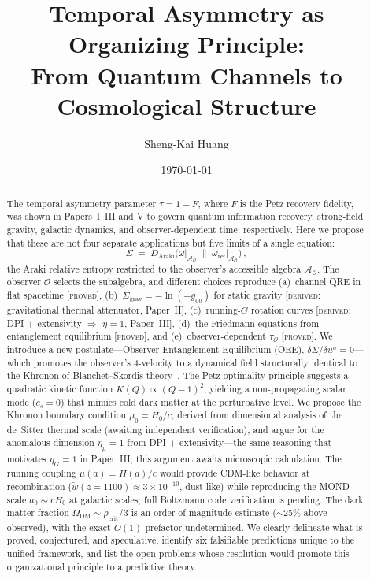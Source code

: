 \documentclass[prd,twocolumn,superscriptaddress,longbibliography,floatfix]{revtex4-2}
\newcommand{\tauasym}{\tau}
\newcommand{\Sgrav}{\Sigma_{\mathrm{grav}}}
\newcommand{\Daraki}{D_{\mathrm{Araki}}}
\newcommand{\Aobs}{\mathcal{A}_{\mathcal{O}}}
\newcommand{\tauO}{\tauasym_{\mathcal{O}}}
\newcommand{\OmDM}{\Omega_{\mathrm{DM}}}
\begin{document}
\title{Temporal Asymmetry as Organizing Principle:\\
From Quantum Channels to Cosmological Structure}

\author{Sheng-Kai Huang}

\date{\today}

\begin{abstract}
The temporal asymmetry parameter $\tauasym = 1 - F$,
where $F$ is the Petz recovery fidelity, was shown in
Papers~I--III and V to govern quantum information recovery,
strong-field gravity, galactic dynamics, and observer-dependent
time, respectively.  Here we propose that these are not four
separate applications but five limits of a single equation:
\begin{equation*}
\Sigma \;=\; \Daraki\!\bigl(\omega\big|_{\Aobs}
\;\big\|\; \omega_{\mathrm{ref}}\big|_{\Aobs}\bigr)\,,
\end{equation*}
the Araki relative entropy restricted to the observer's
accessible algebra $\Aobs$.  The observer $\mathcal{O}$
selects the subalgebra, and different choices reproduce
(a)~channel QRE in flat spacetime [\textsc{proved}],
(b)~$\Sgrav = -\ln(-g_{00})$ for static gravity
[\textsc{derived}: gravitational thermal attenuator,
Paper~II],
(c)~running-$G$ rotation curves [\textsc{derived}: DPI
$+$ extensivity $\Rightarrow$ $\eta = 1$, Paper~III],
(d)~the Friedmann equations from entanglement equilibrium
[\textsc{proved}], and
(e)~observer-dependent $\tauO$ [\textsc{proved}].
We introduce a new postulate---Observer Entanglement
Equilibrium (OEE), $\delta\Sigma/\delta u^a = 0$---which promotes
the observer's 4-velocity to a dynamical field structurally
identical to the Khronon of Blanchet--Skordis
theory~\cite{BlanchetSkordis2024}.  The Petz-optimality
principle suggests a quadratic kinetic function $K(Q) \propto
(Q-1)^2$, yielding a non-propagating scalar mode ($c_s = 0$) that
mimics cold dark matter at the perturbative level.  We propose
the Khronon boundary condition $\mu_0 = H_0/c$, derived from
dimensional analysis of the de~Sitter thermal scale (awaiting
independent verification), and argue for the anomalous dimension
$\eta_\mu = 1$ from DPI $+$ extensivity---the same reasoning
that motivates $\eta_G = 1$ in Paper~III; this argument awaits
microscopic calculation.  The running coupling $\mu(a) = H(a)/c$
would provide CDM-like behavior at recombination
($\tilde{w}(z\!=\!1100) \approx 3 \times 10^{-10}$, dust-like)
while reproducing the MOND scale $a_0 \sim cH_0$ at galactic
scales; full Boltzmann code verification is pending.
The dark matter fraction $\OmDM \sim \rho_{\mathrm{crit}}/3$
is an order-of-magnitude estimate ($\sim$25\% above observed),
with the exact $O(1)$ prefactor undetermined.
We clearly delineate what is proved, conjectured, and
speculative, identify six falsifiable predictions unique to the
unified framework, and list the open problems whose resolution
would promote this organizational principle to a predictive theory.
\end{abstract}
\end{document}
